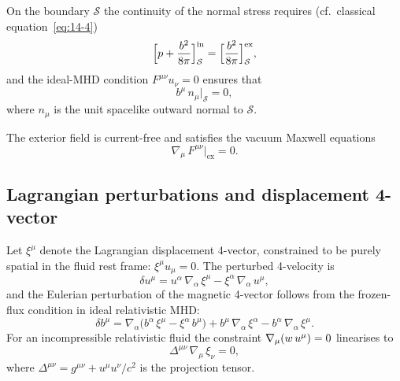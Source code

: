 On the boundary $\mathcal{S}$ the continuity of the normal stress
requires (cf.\ classical equation~\eqref{eq:14-4})
\begin{equation}
  \Bigl[p + \frac{b^{2}}{8\pi}\Bigr]_{\mathcal{S}}^{\mathrm{in}}
  = \Bigl[\frac{b^{2}}{8\pi}\Bigr]_{\mathcal{S}}^{\mathrm{ex}},
  \label{eq:rel14-boundary-stress}
\end{equation}
and the ideal-MHD condition $F^{\mu\nu}u_{\nu}=0$ ensures that
\begin{equation}
  b^{\mu}\,n_{\mu}\big|_{\mathcal{S}} = 0,
  \label{eq:rel14-boundary-bn}
\end{equation}
where $n_{\mu}$ is the unit spacelike outward normal to $\mathcal{S}$.

The exterior field is current-free and satisfies the vacuum Maxwell
equations
\begin{equation}
  \nabla_{\mu}\,F^{\mu\nu}\big|_{\mathrm{ex}} = 0.
  \label{eq:rel14-vacuum-Maxwell}
\end{equation}

\subsection{Lagrangian perturbations and displacement
  4-vector}\label{sec:rel-122-perturb}

Let $\xi^{\mu}$ denote the Lagrangian displacement 4-vector,
constrained to be purely spatial in the fluid rest frame:
$\xi^{\mu}u_{\mu}=0$.  The perturbed 4-velocity is
\begin{equation}
  \delta u^{\mu}
  = u^{\alpha}\,\nabla_{\alpha}\,\xi^{\mu}
  - \xi^{\alpha}\,\nabla_{\alpha}\,u^{\mu},
  \label{eq:rel14-delta-u}
\end{equation}
and the Eulerian perturbation of the magnetic 4-vector follows from
the frozen-flux condition in ideal relativistic MHD:
\begin{equation}
  \delta b^{\mu}
  = \nabla_{\alpha}\bigl(b^{\alpha}\,\xi^{\mu}
    - \xi^{\alpha}\,b^{\mu}\bigr)
  + b^{\mu}\,\nabla_{\alpha}\,\xi^{\alpha}
  - b^{\alpha}\,\nabla_{\alpha}\,\xi^{\mu}.
  \label{eq:rel14-delta-b}
\end{equation}
For an incompressible relativistic fluid the constraint
$\nabla_{\mu}(w\,u^{\mu})=0$ linearises to
\begin{equation}
  \Delta^{\mu\nu}\,\nabla_{\mu}\,\xi_{\nu} = 0,
  \label{eq:rel14-incomp-constraint}
\end{equation}
where $\Delta^{\mu\nu} = g^{\mu\nu} + u^{\mu}u^{\nu}/c^{2}$ is the
projection tensor.

